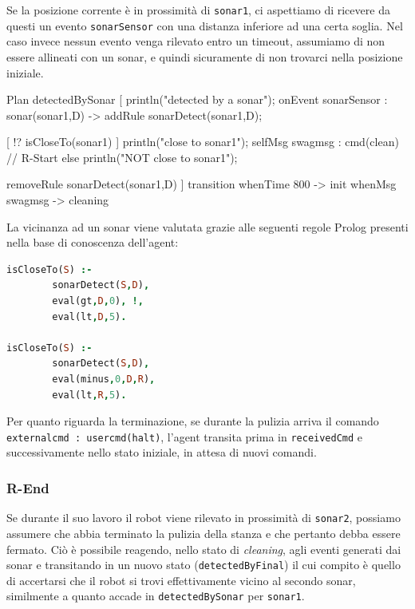 \documentclass{../llncs}
\newcommand{\codescript}[1]{{\mbox{\small{\texttt{#1}}}}\xspace}
\newcommand{\code}[1]{{\color{blue}\small{\texttt{#1}}}}
\begin{document}
Se la posizione corrente è in prossimità di \code{sonar1}, ci aspettiamo di ricevere da questi un evento \codescript{sonarSensor} con una distanza inferiore ad una certa soglia. Nel caso invece nessun evento venga rilevato entro un timeout, assumiamo di non essere allineati con un sonar, e quindi sicuramente di non trovarci nella posizione iniziale.\\

\begin{qacode}[caption={SoftwareAgent, pt2}]
Plan detectedBySonar [
	println("detected by a sonar");
	onEvent sonarSensor : sonar(sonar1,D) -> addRule sonarDetect(sonar1,D);
	
	[ !? isCloseTo(sonar1) ] {
		println("close to sonar1");
		selfMsg swagmsg : cmd(clean) // R-Start
	}
	else
		println("NOT close to sonar1");
		
	removeRule sonarDetect(sonar1,D)
]
transition
	whenTime 800 -> init
	whenMsg swagmsg -> cleaning
\end{qacode}

La vicinanza ad un sonar viene valutata grazie alle seguenti regole Prolog presenti nella base di conoscenza dell'agent:\\

\begin{lstlisting}[language=Prolog, keywordstyle=\color{black}, caption={SoftwareAgent, Rules - pt1}]
isCloseTo(S) :-
		sonarDetect(S,D),
		eval(gt,D,0), !,
		eval(lt,D,5).
	
isCloseTo(S) :-
		sonarDetect(S,D),
		eval(minus,0,D,R),
		eval(lt,R,5).
\end{lstlisting}

Per quanto riguarda la terminazione, se durante la pulizia arriva il comando \codescript{externalcmd : usercmd(halt)}, l'agent transita prima in \codescript{receivedCmd} e successivamente nello stato iniziale, in attesa di nuovi comandi.\\


\subsubsection{R-End}
Se durante il suo lavoro il robot viene rilevato in prossimità di \code{sonar2}, possiamo assumere che abbia terminato la pulizia della stanza e che pertanto debba essere fermato. Ciò è possibile reagendo, nello stato di \emph{cleaning}, agli eventi generati dai sonar e transitando in un nuovo stato (\codescript{detectedByFinal}) il cui compito è quello di accertarsi che il robot si trovi effettivamente vicino al secondo sonar, similmente a quanto accade in \codescript{detectedBySonar} per \code{sonar1}.\\
\end{document}
